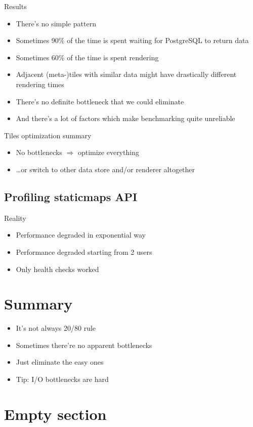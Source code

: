 \documentclass[16pt]{beamer}
\begin{document}
\begin{frame}{Results}
  \begin{itemize}
  \item There's no simple pattern
  \item Sometimes 90\% of the time is spent waiting for PostgreSQL to return data
  \item Sometimes 60\% of the time is spent rendering
  \item Adjacent (meta-)tiles with similar data might have drastically different rendering times
  \item There's no definite bottleneck that we could eliminate
  \item And there's a lot of factors which make benchmarking quite unreliable
  \end{itemize}
\end{frame}

\begin{frame}{Tiles optimization summary}
  \begin{itemize}
  \item No bottlenecks \(\Rightarrow\) optimize everything
  \item \ldots or switch to other data store and/or renderer altogether
  \end{itemize}
\end{frame}

\subsection{Profiling staticmaps API}

\begin{frame}{Reality}
  \begin{itemize}
  \item Performance degraded in exponential way
  \item Performance degraded starting from 2 users
  \item Only health checks worked
  \end{itemize}
\end{frame}

\section*{Summary}

\begin{frame}{}
  \begin{itemize}
  \item It's not always 20/80 rule
  \item Sometimes there're no apparent bottlenecks
  \item Just eliminate the easy ones
  \item Tip: I/O bottlenecks are hard
  \end{itemize}
\end{frame}

\section{Empty section}
\end{document}
